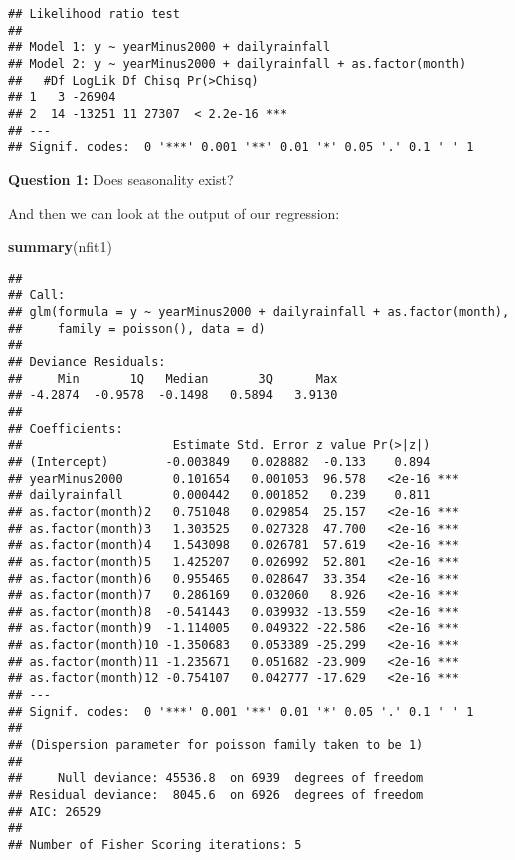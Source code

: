 \documentclass[]{book}
\newenvironment{Shaded}{\begin{snugshade}}{\end{snugshade}}
\newcommand{\KeywordTok}[1]{\textcolor[rgb]{0.13,0.29,0.53}{\textbf{#1}}}
\newcommand{\NormalTok}[1]{#1}
\begin{document}
\begin{verbatim}
## Likelihood ratio test
## 
## Model 1: y ~ yearMinus2000 + dailyrainfall
## Model 2: y ~ yearMinus2000 + dailyrainfall + as.factor(month)
##   #Df LogLik Df Chisq Pr(>Chisq)    
## 1   3 -26904                        
## 2  14 -13251 11 27307  < 2.2e-16 ***
## ---
## Signif. codes:  0 '***' 0.001 '**' 0.01 '*' 0.05 '.' 0.1 ' ' 1
\end{verbatim}

\textbf{Question 1:} Does seasonality exist?

And then we can look at the output of our regression:

\begin{Shaded}
\begin{Highlighting}[]
\KeywordTok{summary}\NormalTok{(nfit1)}
\end{Highlighting}
\end{Shaded}

\begin{verbatim}
## 
## Call:
## glm(formula = y ~ yearMinus2000 + dailyrainfall + as.factor(month), 
##     family = poisson(), data = d)
## 
## Deviance Residuals: 
##     Min       1Q   Median       3Q      Max  
## -4.2874  -0.9578  -0.1498   0.5894   3.9130  
## 
## Coefficients:
##                     Estimate Std. Error z value Pr(>|z|)    
## (Intercept)        -0.003849   0.028882  -0.133    0.894    
## yearMinus2000       0.101654   0.001053  96.578   <2e-16 ***
## dailyrainfall       0.000442   0.001852   0.239    0.811    
## as.factor(month)2   0.751048   0.029854  25.157   <2e-16 ***
## as.factor(month)3   1.303525   0.027328  47.700   <2e-16 ***
## as.factor(month)4   1.543098   0.026781  57.619   <2e-16 ***
## as.factor(month)5   1.425207   0.026992  52.801   <2e-16 ***
## as.factor(month)6   0.955465   0.028647  33.354   <2e-16 ***
## as.factor(month)7   0.286169   0.032060   8.926   <2e-16 ***
## as.factor(month)8  -0.541443   0.039932 -13.559   <2e-16 ***
## as.factor(month)9  -1.114005   0.049322 -22.586   <2e-16 ***
## as.factor(month)10 -1.350683   0.053389 -25.299   <2e-16 ***
## as.factor(month)11 -1.235671   0.051682 -23.909   <2e-16 ***
## as.factor(month)12 -0.754107   0.042777 -17.629   <2e-16 ***
## ---
## Signif. codes:  0 '***' 0.001 '**' 0.01 '*' 0.05 '.' 0.1 ' ' 1
## 
## (Dispersion parameter for poisson family taken to be 1)
## 
##     Null deviance: 45536.8  on 6939  degrees of freedom
## Residual deviance:  8045.6  on 6926  degrees of freedom
## AIC: 26529
## 
## Number of Fisher Scoring iterations: 5
\end{verbatim}
\end{document}
